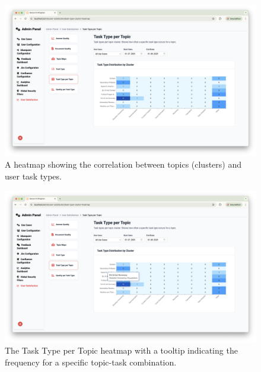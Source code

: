 \documentclass[
	english,
	ruledheaders=section,%
	class=report,%
	thesis={type=bachelor},%
	accentcolor=1b,%
	custommargins=true,%
	marginpar=false,%
	parskip=half-,%
	fontsize=11pt,%
	DIV=14,
]{tudapub}
\begin{document}
\begin{figure}[h!]
    \centering
    \includegraphics[width=0.75\linewidth]{images/TaskTypePerTopic.png}
    \caption{A heatmap showing the correlation between topics (clusters) and user task types.}
    \label{fig:task_type_per_topic}
\end{figure}

\begin{figure}[h!]
    \centering
    \includegraphics[width=0.75\linewidth]{images/TaskTypePerTopicTooltip.png}
    \caption{The Task Type per Topic heatmap with a tooltip indicating the frequency for a specific topic-task combination.}
    \label{fig:task_type_per_topic_tooltip}
\end{figure}

\clearpage %
\end{document}
